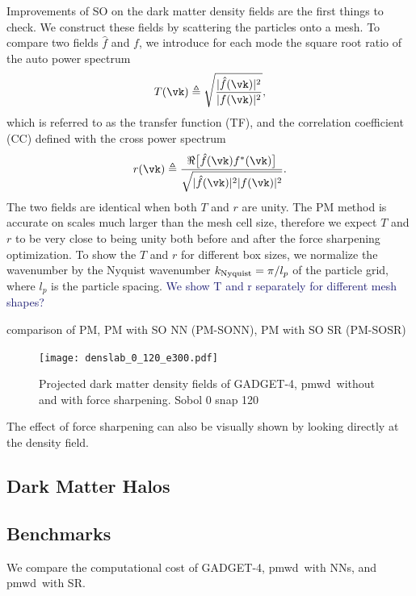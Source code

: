 \documentclass[modern, trackchanges, dvipsnames]{aastex631}
\newcommand{\pmwd}{{\usefont{T1}{nova}{m}{sl}pmwd}}
\newcommand{\GADGET}{{{\fontsize{10pt}{12pt}\selectfont GADGET}-4}}
\newcommand{\YZ}[1]{\textcolor{MidnightBlue}{#1}}
\begin{document}
Improvements of SO on the dark matter density fields are the first
things to check.
We construct these fields by scattering the particles onto a mesh.
To compare two fields $\hat f$ and $f$, we introduce for each mode the
square root ratio of the auto power spectrum
%
\begin{equation}
T(\vk) \triangleq
\sqrt{\frac{|\hat f(\vk)|^2}{|f(\vk)|^2}},
\label{T}
\end{equation}
%
which is referred to as the transfer function (TF), and the correlation
coefficient (CC) defined with the cross power spectrum
%
\begin{equation}
r(\vk) \triangleq
\frac{\Re \bigl[ \hat f(\vk) f^*(\vk) \bigr]}
     {\sqrt{|\hat f(\vk)|^2 |f(\vk)|^2}}.
\label{r}
\end{equation}
%
The two fields are identical when both $T$ and $r$ are unity.
The PM method is accurate on scales much larger than the mesh cell size,
therefore we expect $T$ and $r$ to be very close to being unity both
before and after the force sharpening optimization.
To show the $T$ and $r$ for different box sizes, we normalize the
wavenumber by the Nyquist wavenumber $k_{\rm Nyquist} = \pi / l_p$ of
the particle grid, where $l_p$ is the particle spacing.
\YZ{We show T and r separately for different mesh shapes?}

comparison of PM, PM with SO NN (PM-SONN), PM with SO SR (PM-SOSR)



\begin{figure}
  \centering
  \texttt{[image: denslab\_0\_120\_e300.pdf]}
  \caption{Projected dark matter density fields of \GADGET, \pmwd\ without and
  with force sharpening.
  Sobol 0 snap 120}
  \label{fig:denslab}
\end{figure}

The effect of force sharpening can also be visually shown by looking
directly at the density field.


\subsection{Dark Matter Halos}



\subsection{Benchmarks}
We compare the computational cost of \GADGET, \pmwd\ with NNs, and
\pmwd\ with SR.
\end{document}
